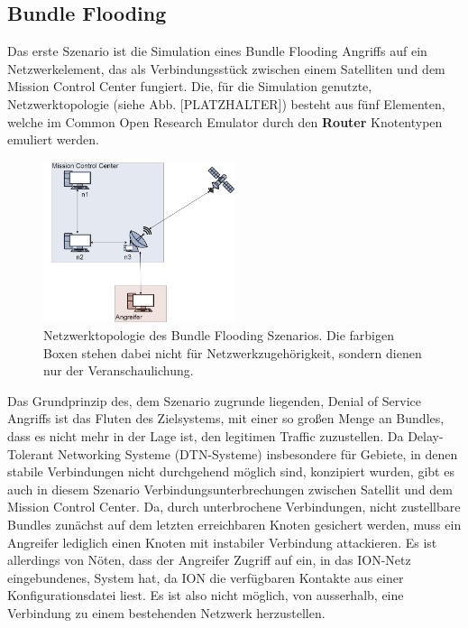 \documentclass{article}
\begin{document}
\subsection{Bundle Flooding}
Das erste Szenario ist die Simulation eines Bundle Flooding Angriffs auf ein Netzwerkelement, das als Verbindungsstück zwischen einem Satelliten und dem Mission Control Center fungiert. Die, für die Simulation genutzte, Netzwerktopologie (siehe Abb. [PLATZHALTER]) besteht aus fünf Elementen, welche im Common Open Research Emulator durch den \textbf{Router} Knotentypen emuliert werden.\par
\begin{figure}[h]
\centering
\includegraphics[width=0.5\textwidth]{flooding}
\caption{Netzwerktopologie des Bundle Flooding Szenarios. Die farbigen Boxen stehen dabei nicht für Netzwerkzugehörigkeit, sondern dienen nur der Veranschaulichung.}
\end{figure}
Das Grundprinzip des, dem Szenario zugrunde liegenden, Denial of Service Angriffs ist das Fluten des Zielsystems, mit einer so großen Menge an Bundles, dass es nicht mehr in der Lage ist, den legitimen Traffic zuzustellen. Da Delay-Tolerant Networking Systeme (DTN-Systeme) insbesondere für Gebiete, in denen stabile Verbindungen nicht durchgehend möglich sind, konzipiert wurden, gibt es auch in diesem Szenario Verbindungsunterbrechungen zwischen Satellit und dem Mission Control Center. Da, durch unterbrochene Verbindungen, nicht zustellbare Bundles zunächst auf dem letzten erreichbaren Knoten gesichert werden, muss ein Angreifer lediglich einen Knoten mit instabiler Verbindung attackieren. Es ist allerdings von Nöten, dass der Angreifer Zugriff auf ein, in das ION-Netz eingebundenes, System hat, da ION die verfügbaren Kontakte aus einer Konfigurationsdatei liest. Es ist also nicht möglich, von ausserhalb, eine Verbindung zu einem bestehenden Netzwerk herzustellen.\par
\end{document}
